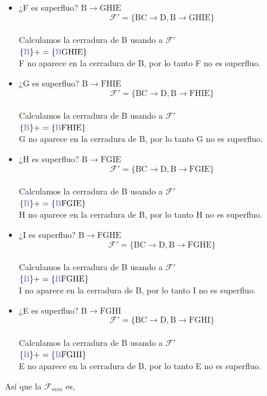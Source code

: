 \documentclass[10pt]{article}
\begin{document}
\begin{itemize}
	\item ¿F es superfluo? $\mathrm{B \rightarrow GHIE}$ \\
	$$\mathcal{F}'=\mathrm{\{ BC \rightarrow D, B \rightarrow GHIE \}}$$\\
	Calculamos la cerradura de B usando a $\mathcal{F}'$\\
	$\mathrm{\{\textcolor{RoyalBlue}{B}\}+= \{\textcolor{RoyalBlue}{B}GHIE\}}$\\
	
	F no aparece en la cerradura de B, por lo tanto F no es superfluo.
	
	\item ¿G es superfluo? $\mathrm{B \rightarrow FHIE}$ \\
	$$\mathcal{F}'=\mathrm{\{ BC \rightarrow D, B \rightarrow FHIE \}}$$\\
	Calculamos la cerradura de B usando a $\mathcal{F}'$\\
	$\mathrm{\{\textcolor{RoyalBlue}{B}\}+= \{\textcolor{RoyalBlue}{B}FHIE\}}$\\
	
	G no aparece en la cerradura de B, por lo tanto G no es superfluo.
	
	\item ¿H es superfluo? $\mathrm{B \rightarrow FGIE}$ \\
	$$\mathcal{F}'=\mathrm{\{ BC \rightarrow D, B \rightarrow FGIE \}}$$\\
	Calculamos la cerradura de B usando a $\mathcal{F}'$\\
	$\mathrm{\{\textcolor{RoyalBlue}{B}\}+= \{\textcolor{RoyalBlue}{B}FGIE\}}$\\
	
	H no aparece en la cerradura de B, por lo tanto H no es superfluo.
	
	\item ¿I es superfluo? $\mathrm{B \rightarrow FGHE}$ \\
	$$\mathcal{F}'=\mathrm{\{ BC \rightarrow D, B \rightarrow FGHE \}}$$\\
	Calculamos la cerradura de B usando a $\mathcal{F}'$\\
	$\mathrm{\{\textcolor{RoyalBlue}{B}\}+= \{\textcolor{RoyalBlue}{B}FGHE\}}$\\
	
	I no aparece en la cerradura de B, por lo tanto I no es superfluo.
	
	\item ¿E es superfluo? $\mathrm{B \rightarrow FGHI}$ \\
	$$\mathcal{F}'=\mathrm{\{ BC \rightarrow D, B \rightarrow FGHI \}}$$\\
	Calculamos la cerradura de B usando a $\mathcal{F}'$\\
	$\mathrm{\{\textcolor{RoyalBlue}{B}\}+= \{\textcolor{RoyalBlue}{B}FGHI\}}$\\
	
	E no aparece en la cerradura de B, por lo tanto E no es superfluo.\\
	
\end{itemize}	
	Así que la $\mathcal{F}_{min}$ es,\\
	
\end{document}
